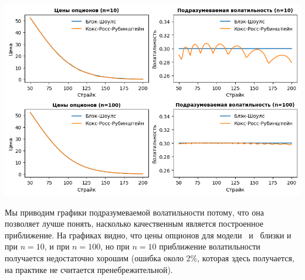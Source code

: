 \noindent
\includegraphics[width=14cm]{pic/crr-limit.png}

\begin{remark}
Мы приводим графики подразумеваемой волатильности потому, что она позволяет лучше понять, насколько качественным является построенное приближение.
На графиках видно, что цены опционов для модели \crr\ и \bs\ близки и при $n=10$, и при $n=100$, но при $n=10$ приближение волатильности получается недостаточно хорошим (ошибка около 2\%, которая здесь получается, на практике не считается пренебрежительной).
\end{remark}
